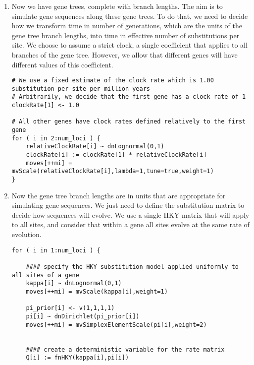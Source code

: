 \begin{enumerate}
{\begin{snugshade*}
\begin{lstlisting}
}

\end{lstlisting}
\end{snugshade*}}

\item Now we have gene trees, complete with branch lengths. The aim is to simulate gene sequences along these gene trees. To do that, we need to decide how we transform time in number of generations, which are the units of the gene tree branch lengths, into time in effective number of substitutions per site. We choose to assume a strict clock, \IE a single coefficient that applies to all branches of the gene tree. However, we allow that different genes will have different values of this coefficient.
{\tt \begin{snugshade*}
\begin{lstlisting}
# We use a fixed estimate of the clock rate which is 1.00 substitution per site per million years 
# Arbitrarily, we decide that the first gene has a clock rate of 1
clockRate[1] <- 1.0

# All other genes have clock rates defined relatively to the first gene
for ( i in 2:num_loci ) { 
    relativeClockRate[i] ~ dnLognormal(0,1)
    clockRate[i] := clockRate[1] * relativeClockRate[i]
    moves[++mi] = mvScale(relativeClockRate[i],lambda=1,tune=true,weight=1)
}

\end{lstlisting}
\end{snugshade*}}

\item Now the gene tree branch lengths are in units that are appropriate for simulating gene sequences. We just need to define the substitution matrix to decide how sequences will evolve. We use a single HKY matrix that will apply to all sites, and consider that within a gene all sites evolve at the same rate of evolution.

{\tt \begin{snugshade*}
\begin{lstlisting}
for ( i in 1:num_loci ) {

    #### specify the HKY substitution model applied uniformly to all sites of a gene
    kappa[i] ~ dnLognormal(0,1)
    moves[++mi] = mvScale(kappa[i],weight=1)

    pi_prior[i] <- v(1,1,1,1) 
    pi[i] ~ dnDirichlet(pi_prior[i])
    moves[++mi] = mvSimplexElementScale(pi[i],weight=2)


    #### create a deterministic variable for the rate matrix
    Q[i] := fnHKY(kappa[i],pi[i]) 


\end{lstlisting}
\end{snugshade*}}
\end{enumerate}
